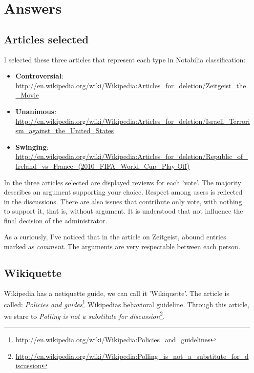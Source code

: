 \documentclass[11pt]{scrartcl}
\begin{document}
\section{Answers}
\label{sec:answers}

\subsection{Articles selected}
\label{sub:list-of-articles}

\par I selected these three articles that represent each type in Notabilia classification:

\begin{itemize}
	\item \textbf{Controversial}: \url{http://en.wikipedia.org/wiki/Wikipedia:Articles_for_deletion/Zeitgeist_the_Movie}
	\item \textbf{Unanimous}: \url{http://en.wikipedia.org/wiki/Wikipedia:Articles_for_deletion/Israeli_Terrorism_against_the_United_States}
	\item \textbf{Swinging}: \url{http://en.wikipedia.org/wiki/Wikipedia:Articles_for_deletion/Republic_of_Ireland_vs_France_(2010_FIFA_World_Cup_Play-Off)}
\end{itemize}

\par In the three articles selected are displayed reviews for each 'vote'. The majority describes an argument supporting your choice. Respect among users is reflected in the discussions.
There are also issues that contribute only vote, with nothing to support it, that is, without argument. It is understood that not influence the final decision of the administrator.

\par As a curiously, I've noticed that in the article on Zeitgeist, abound entries marked as \emph{comment}. The arguments are very respectable between each person.

\subsection{Wikiquette}
\label{sub:wikiquette}

\par Wikipedia has a netiquette guide, we can call it 'Wikiquette'. The article is called: \emph{Policies and guides}\footnote{\url{http://en.wikipedia.org/wiki/Wikipedia:Policies_and_guidelines}} Wikipedias behavioral guideline. Through this article, we stare to \emph{Polling is not a substitute for discussion}\footnote{\url{http://en.wikipedia.org/wiki/Wikipedia:Polling_is_not_a_substitute_for_discussion}}. 
\end{document}
